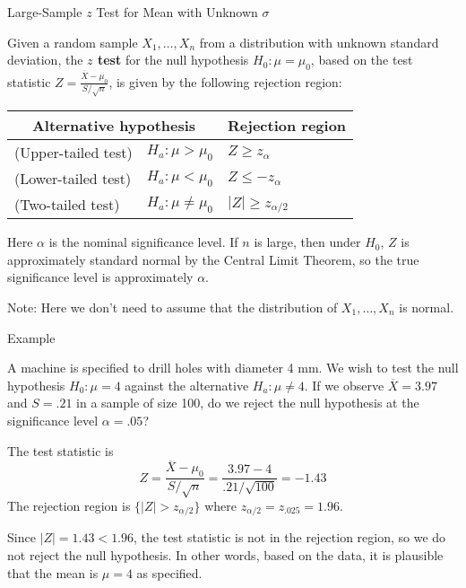 \documentclass[handout]{beamer}
\renewcommand{\emph}{\textbf}
\begin{document}
\begin{frame}{Large-Sample $z$ Test for Mean with Unknown $\sigma$}
\begin{block}{}
Given a random sample $X_1,\dots,X_n$ from a distribution with unknown standard deviation, the \emph{$z$ test} for the null hypothesis $H_0: \mu=\mu_0$, based on the test statistic $Z=\frac{\overline X-\mu_0}{S/\sqrt{n}}$, is given by the following rejection region:
\begin{center}
\begin{tabular}{ll|l}
\multicolumn{2}{c}{Alternative hypothesis} & Rejection region \\ \hline
(Upper-tailed test) & $H_a: \mu>\mu_0$ & $Z\geq z_{\alpha}$ \\
(Lower-tailed test) & $H_a: \mu<\mu_0$ & $Z\leq -z_{\alpha}$ \\
(Two-tailed test) & $H_a: \mu\neq\mu_0$ & $|Z|\geq z_{\alpha/2}$\\
\end{tabular}
\end{center}
Here $\alpha$ is the nominal significance level. If $n$ is large, then under $H_0$, $Z$ is approximately standard normal by the Central Limit Theorem, so the true significance level is approximately $\alpha$.
\end{block}
Note: Here we don't need to assume that the distribution of $X_1,\dots,X_n$ is normal.
\end{frame}


\begin{frame}{Example}
\begin{block}{}
A machine is specified to drill holes with diameter 4 mm. We wish to test the null hypothesis $H_0: \mu=4$ against the alternative $H_a: \mu\neq 4$. If we observe $\overline X=3.97$ and $S=.21$ in a sample of size 100, do we reject the null hypothesis at the significance level $\alpha=.05$?
\end{block}

\pause
The test statistic is 
$$Z=\frac{\overline X-\mu_0}{S/\sqrt{n}}=\frac{3.97-4}{.21/\sqrt{100}}=-1.43$$
\pause The rejection region is $\{|Z|>z_{\alpha/2}\}$ where $z_{\alpha/2}=z_{.025}=1.96$.

\vspace{.2cm}
\pause Since $|Z|=1.43<1.96$, the test statistic is not in the rejection region, so we do not reject the null hypothesis. In other words, based on the data, it is plausible that the mean is $\mu=4$ as specified.
\end{frame}
\end{document}
